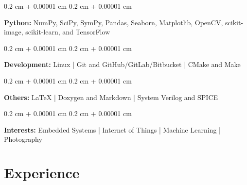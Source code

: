 \documentclass[10pt, letterpaper]{article}
\newenvironment{onecolentry}{
    \begin{adjustwidth}{
        0.2 cm + 0.00001 cm
    }{
        0.2 cm + 0.00001 cm
    }
}{
    \end{adjustwidth}
} %
\begin{document}
        \begin{onecolentry}
            \textbf{Python:} NumPy, SciPy, SymPy, Pandas, Seaborn, Matplotlib, OpenCV, scikit-image, scikit-learn, and TensorFlow
        \end{onecolentry}

        \vspace{0.2 cm}

        \begin{onecolentry}
            \textbf{Development:} Linux | Git and GitHub/GitLab/Bitbucket | CMake and Make
        \end{onecolentry}

        \vspace{0.2 cm}

        \begin{onecolentry}
            \textbf{Others:} LaTeX | Doxygen and Markdown | System Verilog and SPICE
        \end{onecolentry}

        \vspace{0.2 cm}

        \begin{onecolentry}
            \textbf{Interests:} Embedded Systems | Internet of Things | Machine Learning | Photography
        \end{onecolentry}


    
    \section{Experience}
\end{document}
